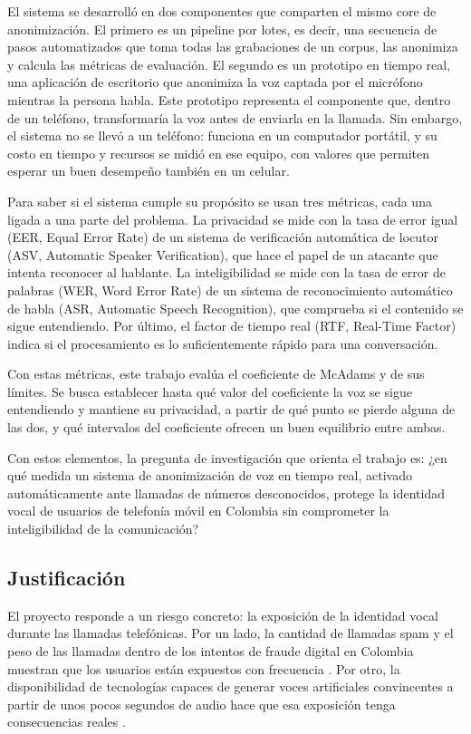 \documentclass[10pt,twocolumn]{article}
\newcommand{\parencite}[1]{\citep{#1}}
\begin{document}
El sistema se desarrolló en dos componentes que comparten el mismo core de anonimización. El primero es un pipeline por lotes, es decir, una secuencia de pasos automatizados que toma todas las grabaciones de un corpus, las anonimiza y calcula las métricas de evaluación. El segundo es un prototipo en tiempo real, una aplicación de escritorio que anonimiza la voz captada por el micrófono mientras la persona habla. Este prototipo representa el componente que, dentro de un teléfono, transformaría la voz antes de enviarla en la llamada. Sin embargo, el sistema no se llevó a un teléfono: funciona en un computador portátil, y su costo en tiempo y recursos se midió en ese equipo, con valores que permiten esperar un buen desempeño también en un celular.

Para saber si el sistema cumple su propósito se usan tres métricas, cada una ligada a una parte del problema. La privacidad se mide con la tasa de error igual (EER, Equal Error Rate) de un sistema de verificación automática de locutor (ASV, Automatic Speaker Verification), que hace el papel de un atacante que intenta reconocer al hablante. La inteligibilidad se mide con la tasa de error de palabras (WER, Word Error Rate) de un sistema de reconocimiento automático de habla (ASR, Automatic Speech Recognition), que comprueba si el contenido se sigue entendiendo. Por último, el factor de tiempo real (RTF, Real-Time Factor) indica si el procesamiento es lo suficientemente rápido para una conversación.

Con estas métricas, este trabajo evalúa el coeficiente de McAdams y de sus límites. Se busca establecer hasta qué valor del coeficiente la voz se sigue entendiendo y mantiene su privacidad, a partir de qué punto se pierde alguna de las dos, y qué intervalos del coeficiente ofrecen un buen equilibrio entre ambas.

Con estos elementos, la pregunta de investigación que orienta el trabajo es: ¿en qué medida un sistema de anonimización de voz en tiempo real, activado automáticamente ante llamadas de números desconocidos, protege la identidad vocal de usuarios de telefonía móvil en Colombia sin comprometer la inteligibilidad de la comunicación?

\subsection{Justificación}\label{sec:1.1}

El proyecto responde a un riesgo concreto: la exposición de la identidad vocal durante las llamadas telefónicas. Por un lado, la cantidad de llamadas spam y el peso de las llamadas dentro de los intentos de fraude digital en Colombia muestran que los usuarios están expuestos con frecuencia \parencite{acis2026,transunion2025}. Por otro, la disponibilidad de tecnologías capaces de generar voces artificiales convincentes a partir de unos pocos segundos de audio hace que esa exposición tenga consecuencias reales \parencite{barrington2025,groupib2025}.
\end{document}
